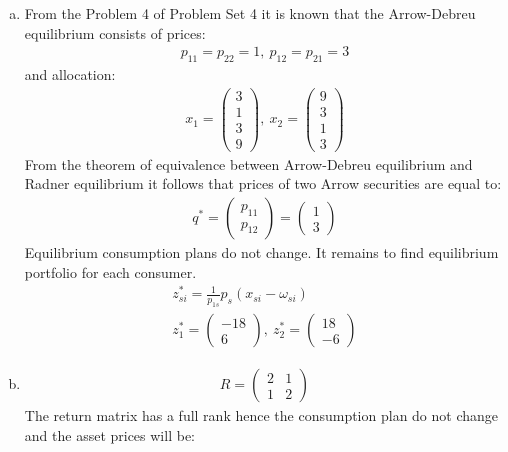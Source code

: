 \documentclass[a4paper]{article}
\begin{document}
\begin{enumerate}[(a)]
	\item From the Problem 4 of Problem Set 4 it is known that the Arrow-Debreu equilibrium consists of prices:
	\begin{align*}
	p_{11} = p_{22} = 1,\ p_{12} = p_{21} = 3
	\end{align*}
	and allocation:
	\begin{align*}
	x_1 = \begin{pmatrix}
	3\\
	1\\
	3\\
	9
	\end{pmatrix},\ x_2 = \begin{pmatrix}
	9\\
	3\\
	1\\
	3
	\end{pmatrix}
	\end{align*}
From the theorem of equivalence between Arrow-Debreu equilibrium and Radner equilibrium it follows that prices of two Arrow securities are equal to:
\begin{align*}
q^* = \begin{pmatrix}
p_{11}\\
p_{12}
\end{pmatrix} = \begin{pmatrix}
1\\
3
\end{pmatrix}
\end{align*}
Equilibrium consumption plans do not change. It remains to find equilibrium portfolio for each consumer. 
\begin{align*}
z^*_{si} = \frac{1}{p_{1s}}p_s(x_{si} - \omega_{si})\\
z^*_{1} =  \begin{pmatrix}
-18\\
6
\end{pmatrix},\ z^*_{2} = \begin{pmatrix}
18\\
-6
\end{pmatrix}
\end{align*}
\item 
\begin{align*}
R = \begin{pmatrix}
2 & 1\\
1 & 2
\end{pmatrix}
\end{align*}
The return matrix has a full rank hence the consumption plan do not change and the asset prices will be:

\end{enumerate}
\end{document}
